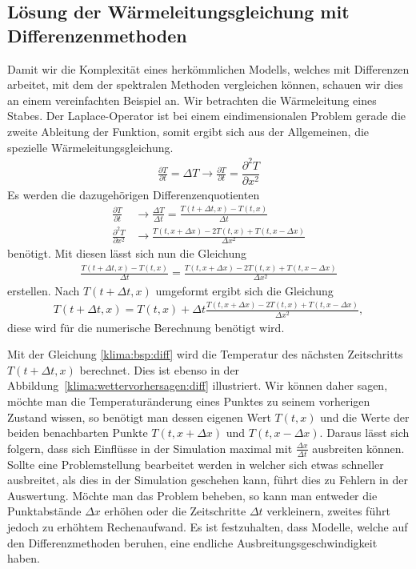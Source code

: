 \begin{refsection}
\subsection{Lösung der Wärmeleitungsgleichung mit Differenzenmethoden}
Damit wir die Komplexität eines herkömmlichen Modells, welches mit Differenzen arbeitet, mit dem der spektralen Methoden vergleichen können, schauen wir dies an einem vereinfachten Beispiel an. Wir betrachten die Wärmeleitung eines Stabes.
Der Laplace-Operator ist bei einem eindimensionalen Problem gerade die zweite Ableitung der Funktion, somit ergibt sich aus der Allgemeinen, die spezielle Wärmeleitungsgleichung.
\begin{align}
\frac{\partial T}{\partial t} = \Delta T \rightarrow \frac{\partial T}{\partial t}=\dfrac{\partial^2 T}{\partial x^2}
\end{align}
Es werden die dazugehörigen Differenzenquotienten
\begin{align}
\frac{\partial T}{\partial t}
&\rightarrow
\frac{\Delta T}{\Delta t}=
\frac{T(t+\Delta t,x)-T(t,x)}{\Delta t}
\\
\frac{\partial^2 T}{\partial x^2}
&\rightarrow
\frac{T(t,x+\Delta x)-2T(t,x)+T(t,x-\Delta x)}{\Delta x^2}
\end{align}
benötigt. Mit diesen lässt sich nun die Gleichung
\begin{align}
\frac{T(t+\Delta t,x)-T(t,x)}{\Delta t}
=
\frac{T(t,x+\Delta x)-2T(t,x)+T(t,x-\Delta x)}{\Delta x^2}
\end{align}
erstellen. Nach $T(t+\Delta t,x)$ umgeformt ergibt sich die Gleichung
\begin{align}
T(t+\Delta t,x)
=
T(t,x)+\Delta t \frac{T(t,x+\Delta x)-2T(t,x)+T(t,x-\Delta x)}{\Delta x^2},
\label{klima:bsp:diff}
\end{align}
diese wird für die numerische Berechnung benötigt wird.

Mit der Gleichung \eqref{klima:bsp:diff} wird die Temperatur des nächsten Zeitschritts $T(t+\Delta t,x)$ berechnet. Dies ist ebenso in der Abbildung~\ref{klima:wettervorhersagen:diff} illustriert. Wir können daher sagen, möchte man die Temperaturänderung eines Punktes zu seinem vorherigen Zustand wissen, so benötigt man dessen eigenen Wert $T(t,x)$ und die Werte der beiden benachbarten Punkte $T(t,x+\Delta x)$ und $T(t,x-\Delta x)$. Daraus lässt sich folgern, dass sich Einflüsse in der Simulation maximal mit $\frac{\Delta x}{\Delta t}$ ausbreiten können. Sollte eine Problemstellung bearbeitet werden in welcher sich etwas schneller ausbreitet, als dies in der Simulation geschehen kann, führt dies zu Fehlern in der Auswertung. Möchte man das Problem beheben, so kann man entweder die Punktabstände $\Delta x$ erhöhen oder die Zeitschritte $\Delta t$ verkleinern, zweites führt jedoch zu erhöhtem Rechenaufwand. Es ist festzuhalten, dass Modelle, welche auf den Differenzmethoden beruhen, eine endliche Ausbreitungsgeschwindigkeit haben.


\end{refsection}
